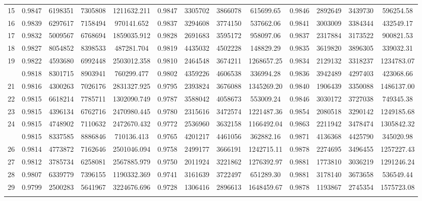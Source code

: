 \documentclass[
  12pt,
]{article}
\begin{document}
\begin{longtable}[t]{lcccccccccccc}
15 & 0.9847 & 6198351 & 7305808 & 1211632.211 & 0.9847 & 3305702 & 3866078 & 615699.65 & 0.9846 & 2892649 & 3439730 & 596254.58\\
16 & 0.9839 & 6297617 & 7158494 & 970141.652 & 0.9837 & 3294608 & 3774150 & 537662.06 & 0.9841 & 3003009 & 3384344 & 432549.17\\
17 & 0.9832 & 5009567 & 6768694 & 1859035.912 & 0.9828 & 2691683 & 3595172 & 958097.06 & 0.9837 & 2317884 & 3173522 & 900821.53\\
18 & 0.9827 & 8054852 & 8398533 & 487281.704 & 0.9819 & 4435032 & 4502228 & 148829.29 & 0.9835 & 3619820 & 3896305 & 339032.31\\
19 & 0.9822 & 4593680 & 6992448 & 2503012.358 & 0.9810 & 2464548 & 3674211 & 1268657.25 & 0.9834 & 2129132 & 3318237 & 1234783.07\\
\addlinespace
20 & 0.9818 & 8301715 & 8903941 & 760299.477 & 0.9802 & 4359226 & 4606538 & 336994.28 & 0.9836 & 3942489 & 4297403 & 423068.66\\
21 & 0.9816 & 4300263 & 7026176 & 2831327.925 & 0.9795 & 2393824 & 3676088 & 1345269.20 & 0.9840 & 1906439 & 3350088 & 1486137.00\\
22 & 0.9815 & 6618214 & 7785711 & 1302090.749 & 0.9787 & 3588042 & 4058673 & 553009.24 & 0.9846 & 3030172 & 3727038 & 749345.38\\
23 & 0.9815 & 4396134 & 6762716 & 2470980.445 & 0.9780 & 2315616 & 3472574 & 1221487.36 & 0.9854 & 2080518 & 3290142 & 1249185.68\\
24 & 0.9815 & 4748902 & 7110632 & 2472670.432 & 0.9772 & 2536960 & 3632158 & 1166492.04 & 0.9863 & 2211942 & 3478474 & 1305842.32\\
\addlinespace
25 & 0.9815 & 8337585 & 8886846 & 710136.413 & 0.9765 & 4201217 & 4461056 & 362882.16 & 0.9871 & 4136368 & 4425790 & 345020.98\\
26 & 0.9814 & 4773872 & 7162646 & 2501046.094 & 0.9758 & 2499177 & 3666191 & 1242715.11 & 0.9878 & 2274695 & 3496455 & 1257227.43\\
27 & 0.9812 & 3785734 & 6258081 & 2567885.979 & 0.9750 & 2011924 & 3221862 & 1276392.97 & 0.9881 & 1773810 & 3036219 & 1291246.24\\
28 & 0.9807 & 6339779 & 7396155 & 1190332.369 & 0.9741 & 3161639 & 3722497 & 651289.30 & 0.9881 & 3178140 & 3673658 & 536549.44\\
29 & 0.9799 & 2500283 & 5641967 & 3224676.696 & 0.9728 & 1306416 & 2896613 & 1648459.67 & 0.9878 & 1193867 & 2745354 & 1575723.08\\
\addlinespace

\end{longtable}
\end{document}
